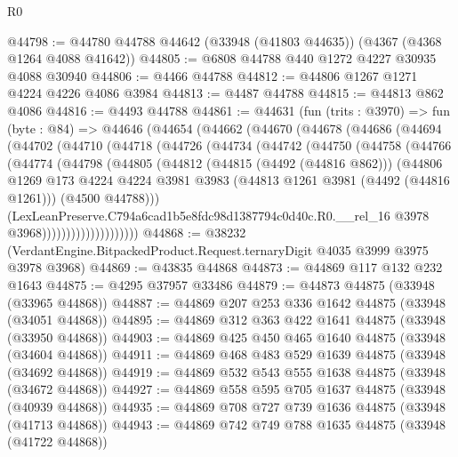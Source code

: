 \begin{lexlean}{R0}
\begin{coremodule}
@44798 := @44780 @44788 @44642 (@33948 (@41803 @44635)) (@4367 (@4368 @1264 @4088 @41642))
@44805 := @6808 @44788 @440 @1272 @4227 @30935 @4088 @30940
@44806 := @4466 @44788
@44812 := @44806 @1267 @1271 @4224 @4226 @4086 @3984
@44813 := @4487 @44788
@44815 := @44813 @862 @4086
@44816 := @4493 @44788
@44861 := @44631
    (fun (trits : @3970) =>
    fun (byte : @84) =>
    @44646
      (@44654
        (@44662
          (@44670
            (@44678
              (@44686
                (@44694
                  (@44702
                    (@44710
                      (@44718
                        (@44726
                          (@44734
                            (@44742
                              (@44750
                                (@44758
                                  (@44766
                                    (@44774
                                      (@44798
                                        (@44805
                                          (@44812
                                            (@44815 (@4492 (@44816 @862)))
                                            (@44806
                                              @1269
                                              @173
                                              @4224
                                              @4224
                                              @3981
                                              @3983
                                              (@44813 @1261 @3981 (@4492 (@44816 @1261)))
                                              (@4500 @44788)))
                                          (LexLeanPreserve.C794a6cad1b5e8fdc98d1387794c0d40c.R0.__rel_16
                                            @3978
                                            @3968))))))))))))))))))))
@44868 := @38232 (VerdantEngine.BitpackedProduct.Request.ternaryDigit @4035 @3999 @3975 @3978 @3968)
@44869 := @43835 @44868
@44873 := @44869 @117 @132 @232 @1643
@44875 := @4295 @37957 @33486
@44879 := @44873 @44875 (@33948 (@33965 @44868))
@44887 := @44869 @207 @253 @336 @1642 @44875 (@33948 (@34051 @44868))
@44895 := @44869 @312 @363 @422 @1641 @44875 (@33948 (@33950 @44868))
@44903 := @44869 @425 @450 @465 @1640 @44875 (@33948 (@34604 @44868))
@44911 := @44869 @468 @483 @529 @1639 @44875 (@33948 (@34692 @44868))
@44919 := @44869 @532 @543 @555 @1638 @44875 (@33948 (@34672 @44868))
@44927 := @44869 @558 @595 @705 @1637 @44875 (@33948 (@40939 @44868))
@44935 := @44869 @708 @727 @739 @1636 @44875 (@33948 (@41713 @44868))
@44943 := @44869 @742 @749 @788 @1635 @44875 (@33948 (@41722 @44868))

\end{coremodule}
\end{lexlean}
